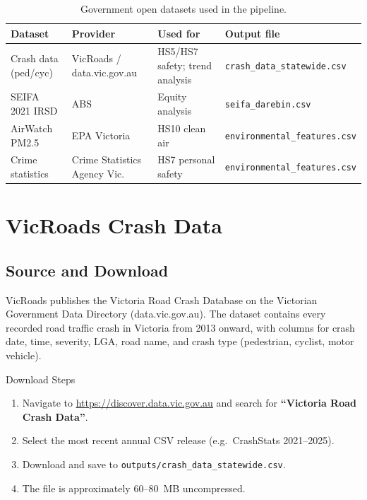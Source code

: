\documentclass[11pt,a4paper,openany]{book}
\begin{document}
\begin{table}[H]
\centering
\caption{Government open datasets used in the pipeline.}
\label{tab:eight:sources}
\begin{tabular}{L{3cm} L{3.5cm} L{4cm} L{2.5cm}}
\toprule
\textbf{Dataset} & \textbf{Provider} & \textbf{Used for} & \textbf{Output file} \\
\midrule
Crash data (ped/cyc) & VicRoads / data.vic.gov.au & HS5/HS7 safety; trend analysis & \texttt{crash\_data\_statewide.csv} \\
SEIFA 2021 IRSD & ABS & Equity analysis & \texttt{seifa\_darebin.csv} \\
AirWatch PM2.5 & EPA Victoria & HS10 clean air & \texttt{environmental\_features.csv} \\
Crime statistics & Crime Statistics Agency Vic. & HS7 personal safety & \texttt{environmental\_features.csv} \\
\bottomrule
\end{tabular}
\end{table}

\section{VicRoads Crash Data}

\subsection{Source and Download}

VicRoads publishes the Victoria Road Crash Database on the Victorian Government Data Directory (data.vic.gov.au). The dataset contains every recorded road traffic crash in Victoria from 2013 onward, with columns for crash date, time, severity, LGA, road name, and crash type (pedestrian, cyclist, motor vehicle).

\begin{tipbox}{Download Steps}
\begin{enumerate}
  \item Navigate to \url{https://discover.data.vic.gov.au} and search for \textbf{``Victoria Road Crash Data''}.
  \item Select the most recent annual CSV release (e.g.\ CrashStats 2021--2025).
  \item Download and save to \texttt{outputs/crash\_data\_statewide.csv}.
  \item The file is approximately 60--80~MB uncompressed.
\end{enumerate}
\end{tipbox}
\end{document}
